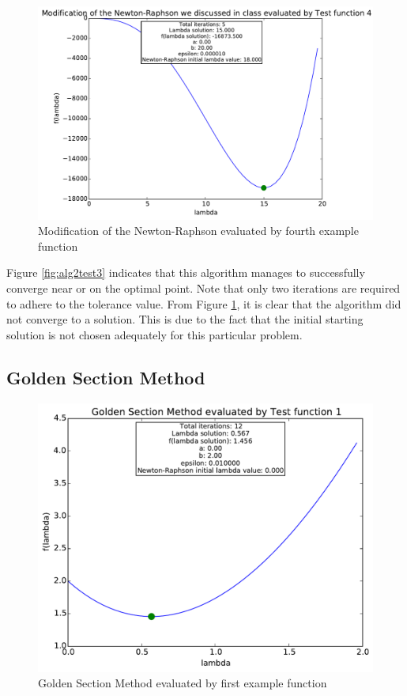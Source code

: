 \documentclass[a4paper,10pt]{article}
\begin{document}
\begin{figure}[h]
\centering
 \includegraphics[scale=0.55]{./graphs/algorithm2/x90percentofb/testFunction4.pdf} 
 \caption{Modification of the Newton-Raphson evaluated by fourth example function}
 \label{fig:alg2test4}
\end{figure}

Figure \ref{fig:alg2test3} indicates that this algorithm manages to successfully converge near or on the optimal point. Note that only two iterations are required to adhere to the tolerance value. From Figure \ref{fig:alg2test4}, it is clear that the algorithm did not converge to a solution. This is due to the fact that the initial starting solution is not chosen adequately for this particular problem. 

\newpage
\subsection{Golden Section Method}
\begin{figure}[h]
\centering
 \includegraphics[scale=0.55]{./graphs/algorithm3/testFunction1.pdf} 
 \caption{Golden Section Method evaluated by first example function}
 \label{fig:alg3test1}
\end{figure}
\end{document}
